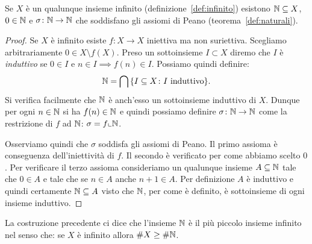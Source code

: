 \begin{theorem}
  \label{th:esistenza_naturali}%
Se $X$ è un qualunque insieme infinito (definizione~\ref{def:infinito})
esistono ${\mathbb N}\subseteq X$, $0\in {\mathbb N}$ e $\sigma\colon {\mathbb N}\to{\mathbb N}$ 
che soddisfano gli assiomi di Peano (teorema~\ref{def:naturali}).
\end{theorem}
%
\begin{proof}
Se $X$ è infinito esiste $f\colon X\to X$ iniettiva ma non suriettiva. 
Scegliamo arbitrariamente $0\in X\setminus f(X)$. 
Preso un sottoinsieme $I\subset X$ diremo che $I$ è \emph{induttivo}
%
%
se $0\in I$ e $n\in I\implies f(n)\in I$. 
Possiamo quindi definire:
\[
  {\mathbb N} = \bigcap {\left\{ I\subseteq X\colon \text{$I$ induttivo} \right\}}.
\]
Si verifica facilmente che ${\mathbb N}$ è anch'esso un sottoinsieme induttivo di $X$.
Dunque per ogni $n\in {\mathbb N}$ si ha $f(n)\in {\mathbb N}$ e quindi possiamo 
definire $\sigma\colon {\mathbb N}\to {\mathbb N}$ come la restrizione di $f$ 
ad ${\mathbb N}$: $\sigma=f\llcorner {\mathbb N}$.

Osserviamo quindi che $\sigma$ soddisfa gli assiomi di Peano.
Il primo assioma è conseguenza dell'iniettività di $f$.
Il secondo è verificato per come abbiamo scelto $0$.
Per verificare il terzo assioma consideriamo un qualunque insieme 
$A\subseteq {\mathbb N}$ tale che $0\in A$ e tale che se $n\in A$ anche $n+1\in A$.
Per definizione $A$ è induttivo e quindi certamente 
${\mathbb N}\subseteq A$ visto che ${\mathbb N}$, per come è definito,
è sottoinsieme di ogni insieme induttivo.
\end{proof}

La costruzione precedente ci dice che l'insieme ${\mathbb N}$ è il più piccolo insieme infinito
nel senso che: se $X$ è infinito allora $\# X \ge \# {\mathbb N}$. 



